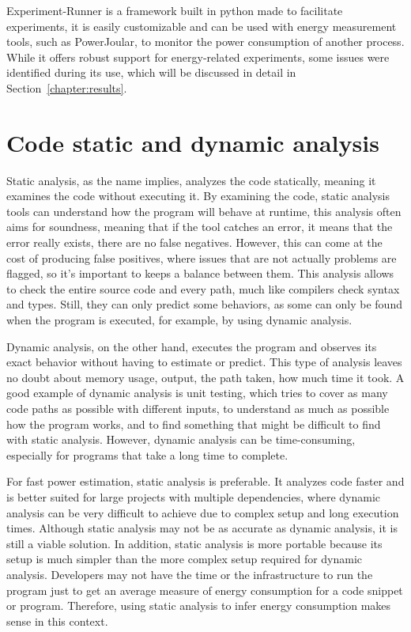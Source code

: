Experiment-Runner\cite{S2_Group_Experiment_Runner} is a framework built in python made to facilitate experiments, it is easily customizable and can be used with energy measurement tools, such as PowerJoular, to monitor the power consumption of another process. While it offers robust support for energy-related experiments, some issues were identified during its use, which will be discussed in detail in Section~\ref{chapter:results}.


\section{Code static and dynamic analysis} \label{sec:background_static_dynamic_analysis}

Static analysis, as the name implies, analyzes the code statically, meaning it examines the code without executing it. By examining the code, static analysis tools can understand how the program will behave at runtime\cite{ernst2003static}, this analysis often aims for soundness, meaning that if the tool catches an error, it means that the error really exists, there are no false negatives. However, this can come at the cost of producing false positives, where issues that are not actually problems are flagged, so it's important to keeps a balance between them. This analysis allows to check the entire source code and every path, much like compilers check syntax and types. Still, they can only predict some behaviors, as some can only be found when the program is executed, for example, by using dynamic analysis.

Dynamic analysis, on the other hand, executes the program and observes its exact behavior without having to estimate or predict. This type of analysis leaves no doubt about memory usage, output, the path taken, how much time it took\cite{ernst2003static}. A good example of dynamic analysis is unit testing, which tries to cover as many code paths as possible with different inputs, to understand as much as possible how the program works, and to find something that might be difficult to find with static analysis. However, dynamic analysis can be time-consuming, especially for programs that take a long time to complete.

For fast power estimation, static analysis is preferable. It analyzes code faster and is better suited for large projects with multiple dependencies, where dynamic analysis can be very difficult to achieve due to complex setup and long execution times. Although static analysis may not be as accurate as dynamic analysis, it is still a viable solution. In addition, static analysis is more portable because its setup is much simpler than the more complex setup required for dynamic analysis.
Developers may not have the time or the infrastructure to run the program just to get an average measure of energy consumption for a code snippet or program. Therefore, using static analysis to infer energy consumption makes sense in this context.

